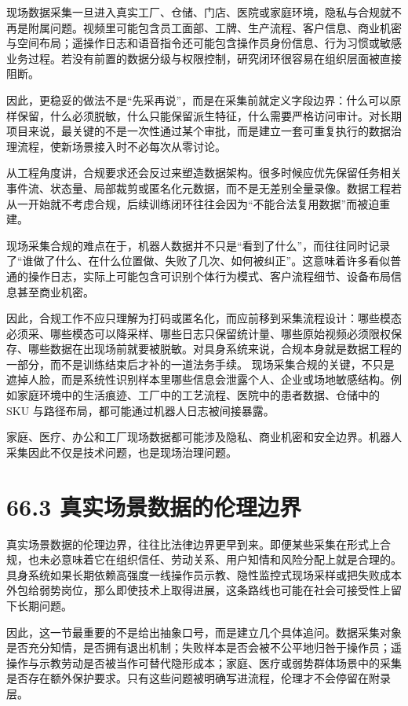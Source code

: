 现场数据采集一旦进入真实工厂、仓储、门店、医院或家庭环境，隐私与合规就不再是附属问题。视频里可能包含员工面部、工牌、生产流程、客户信息、商业机密与空间布局；遥操作日志和语音指令还可能包含操作员身份信息、行为习惯或敏感业务过程。若没有前置的数据分级与权限控制，研究闭环很容易在组织层面被直接阻断。

因此，更稳妥的做法不是“先采再说”，而是在采集前就定义字段边界：什么可以原样保留，什么必须脱敏，什么只能保留派生特征，什么需要严格访问审计。对长期项目来说，最关键的不是一次性通过某个审批，而是建立一套可重复执行的数据治理流程，使新场景接入时不必每次从零讨论。

从工程角度讲，合规要求还会反过来塑造数据架构。很多时候应优先保留任务相关事件流、状态量、局部裁剪或匿名化元数据，而不是无差别全量录像。数据工程若从一开始就不考虑合规，后续训练闭环往往会因为“不能合法复用数据”而被迫重建。

现场采集合规的难点在于，机器人数据并不只是“看到了什么”，而往往同时记录了“谁做了什么、在什么位置做、失败了几次、如何被纠正”。这意味着许多看似普通的操作日志，实际上可能包含可识别个体行为模式、客户流程细节、设备布局信息甚至商业机密。

因此，合规工作不应只理解为打码或匿名化，而应前移到采集流程设计：哪些模态必须采、哪些模态可以降采样、哪些日志只保留统计量、哪些原始视频必须限权保存、哪些数据在出现场前就要被脱敏。对具身系统来说，合规本身就是数据工程的一部分，而不是训练结束后才补的一道法务手续。 现场采集合规的关键，不只是遮掉人脸，而是系统性识别样本里哪些信息会泄露个人、企业或场地敏感结构。例如家庭环境中的生活痕迹、工厂中的工艺流程、医院中的患者数据、仓储中的 SKU 与路径布局，都可能通过机器人日志被间接暴露。

家庭、医疗、办公和工厂现场数据都可能涉及隐私、商业机密和安全边界。机器人采集因此不仅是技术问题，也是现场治理问题。

\section*{66.3 真实场景数据的伦理边界}


真实场景数据的伦理边界，往往比法律边界更早到来。即便某些采集在形式上合规，也未必意味着它在组织信任、劳动关系、用户知情和风险分配上就是合理的。具身系统如果长期依赖高强度一线操作员示教、隐性监控式现场采样或把失败成本外包给弱势岗位，那么即使技术上取得进展，这条路线也可能在社会可接受性上留下长期问题。

因此，这一节最重要的不是给出抽象口号，而是建立几个具体追问。数据采集对象是否充分知情，是否拥有退出机制；失败样本是否会被不公平地归咎于操作员；遥操作与示教劳动是否被当作可替代隐形成本；家庭、医疗或弱势群体场景中的采集是否存在额外保护要求。只有这些问题被明确写进流程，伦理才不会停留在附录层。

